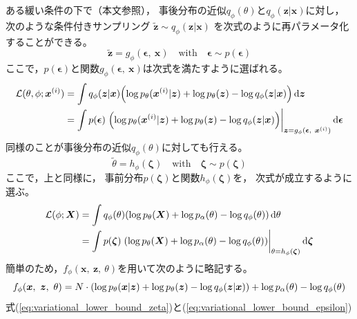 \documentclass[dvipdfmx, fleqn, draft]{jsarticle}
\begin{document}
ある緩い条件の下で（本文参照），
事後分布の近似\(q_{\phi} (\theta)\)と\(q_{\phi} (\bm{z} | \bm{x})\)に対し，
次のような条件付きサンプリング
\(\tilde{\bm{z}} \sim q_{\phi} (\bm{z} | \bm{x})\)
を次式のように再パラメータ化することができる。
\begin{equation}
    \tilde{\bm{z}} = g_{\phi} (\bm{\epsilon},\ \bm{x})
    \quad \text{with} \quad
    \bm{\epsilon} \sim p(\bm{\epsilon})
\end{equation}
ここで，\(p(\bm{\epsilon})\)と関数\(g_{\phi} (\bm{\epsilon},\ \bm{x})\)は次式を満たすように選ばれる。
\begin{align}
    \mathcal{L}(\theta, \phi; \bm{x}^{(i)})
        & = \int q_{\phi} (\bm{z} | \bm{x}) \qty(\log{p_{\theta} (\bm{x}^{(i)} | \bm{z})} + \log{p_{\theta} (\bm{z})} - \log{q_{\phi} (\bm{z} | \bm{x})}) \dd{\bm{z}}
        \notag \\
        & = \int p(\bm{\epsilon}) \eval{\qty(\log{p_{\theta} (\bm{x}^{(i)} | \bm{z})} + \log{p_{\theta} (\bm{z})} - \log{q_{\phi} (\bm{z} | \bm{x})})}_{\bm{z} = g_{\phi} (\bm{\epsilon},\ \bm{x}^{(i)})} \dd{\bm{\epsilon}}
    \label{eq:variational_lower_bound_epsilon}
\end{align}
同様のことが事後分布の近似\(q_{\phi} (\theta)\)に対しても行える。
\begin{equation}
    \tilde{\theta} = h_{\phi} (\bm{\zeta})
    \quad \text{with} \quad
    \bm{\zeta} \sim p(\bm{\zeta})
\end{equation}
ここで，上と同様に，
事前分布\(p(\bm{\zeta})\)と関数\(h_{\phi} (\bm{\zeta})\)を，
次式が成立するように選ぶ。
\begin{align}
    \mathcal{L}(\phi; \bm{X})
        & = \int q_{\phi} (\theta) \qty(\log{p_{\theta} (\bm{X})} + \log{p_{\alpha} (\theta)} - \log{q_{\phi} (\theta)}) \dd{\theta}
        \notag \\
        & = \int p(\bm{\zeta}) \eval{\qty(\log{p_{\theta} (\bm{X})} + \log{p_{\alpha} (\theta)} - \log{q_{\phi} (\theta)})}_{\theta = h_{\phi} (\bm{\zeta})} \dd{\bm{\zeta}}
    \label{eq:variational_lower_bound_zeta}
\end{align}
簡単のため，\(f_{\phi} (\bm{x},\ \bm{z},\ \theta)\)を用いて次のように略記する。
\begin{equation}
    f_{\phi} (\bm{x},\ \bm{z},\ \theta) = N \cdot \qty(\log{p_{\theta} (\bm{x} | \bm{z})} + \log{p_{\theta} (\bm{z})} - \log{q_{\phi} (\bm{z} | \bm{x})}) + \log{p_{\alpha} (\theta)} - \log{q_{\phi} (\theta)}
    \label{eq:shorthand}
\end{equation}
式(\ref{eq:variational_lower_bound_zeta})と(\ref{eq:variational_lower_bound_epsilon})
\end{document}
